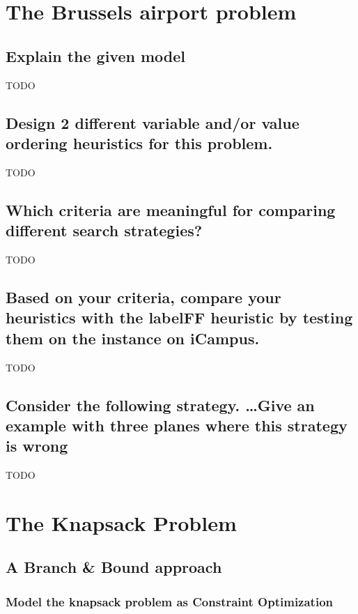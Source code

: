 \documentclass[a4paper ,12pt,french]{article}
\begin{document}
\tableofcontents %

\thispagestyle{fancy}

\pagebreak
\setcounter{page}{1}
\pagestyle{fancy} %

\section{The Brussels airport problem}

\subsection{Explain the given model}
TODO
\subsection{Design 2 different variable and/or value ordering heuristics for this problem.}
TODO
\subsection{Which criteria are meaningful for comparing different search strategies?}
TODO
\subsection{Based on your criteria, compare your heuristics with the labelFF heuristic by testing them on the instance on iCampus.}
TODO
\subsection{Consider the following strategy. \dots Give an example with three planes where this strategy is wrong}
TODO

\section{The Knapsack Problem}

\subsection{A Branch \& Bound approach}

\subsubsection{Model the knapsack problem as Constraint Optimization}

\end{document}
